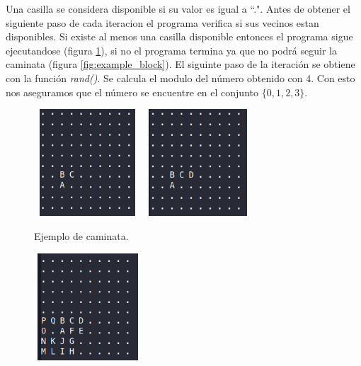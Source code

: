 Una casilla se considera disponible si su valor es igual a ``.". Antes de obtener el siguiente paso de cada iteracion el programa verifica si sus vecinos estan disponibles. Si existe al menos una casilla disponible entonces el programa sigue ejecutandose (figura \ref{fig:example_walk}), si no el programa termina ya que no podrá seguir la caminata (figura \ref{fig:example_block}). El siguinte paso de la iteración se obtiene con la función \textit{rand()}. Se calcula el modulo del número obtenido con 4. Con esto nos aseguramos que el número se encuentre en el conjunto $\{0, 1, 2 ,3\}$.
\begin{center}
    \begin{minipage}{0.48\linewidth}
        \begin{figure}[H]
            \centering
            \includegraphics[width=4cm,height=4cm]{Graphics/example_2_1_problem1.png}
            \includegraphics[width=4cm,height=4cm]{Graphics/example_2_2_problem1.png}
            \caption{Ejemplo de caminata.}
            \label{fig:example_walk}
        \end{figure}
    \end{minipage}
    \begin{minipage}{0.48\linewidth}
        \begin{figure}[H]
            \centering
            \includegraphics[width=4cm,height=4cm]{Graphics/example_3_1_problem1.png}

\end{figure}
\end{minipage}
\end{center}

